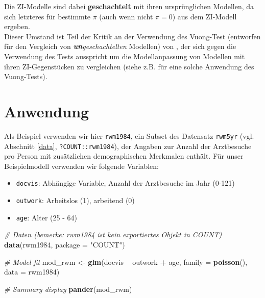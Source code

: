 \documentclass[ngerman,a4paper,]{scrartcl}
\newenvironment{Shaded}{\begin{snugshade}}{\end{snugshade}}
\newcommand{\CommentTok}[1]{\textcolor[rgb]{0.56,0.35,0.01}{\textit{#1}}}
\newcommand{\DataTypeTok}[1]{\textcolor[rgb]{0.13,0.29,0.53}{#1}}
\newcommand{\KeywordTok}[1]{\textcolor[rgb]{0.13,0.29,0.53}{\textbf{#1}}}
\newcommand{\NormalTok}[1]{#1}
\newcommand{\OperatorTok}[1]{\textcolor[rgb]{0.81,0.36,0.00}{\textbf{#1}}}
\newcommand{\StringTok}[1]{\textcolor[rgb]{0.31,0.60,0.02}{#1}}
\providecommand{\tightlist}{%
  \setlength{\itemsep}{0pt}\setlength{\parskip}{0pt}}
\theoremstyle{definition}
\theoremstyle{definition}
\theoremstyle{definition}
\theoremstyle{remark}
\begin{document}
Die ZI-Modelle sind dabei \textbf{geschachtelt} mit ihren ursprünglichen Modellen, da sich letzteres für bestimmte \(\pi\) (auch wenn nicht \(\pi = 0\)) aus dem ZI-Modell ergeben.\\
Dieser Umstand ist Teil der Kritik an der Verwendung des Vuong-Test (entworfen für den Vergleich von \emph{\textbf{un}geschachtelten} Modellen) von \citet{wilson2015MisuseVuong}, der sich gegen die Verwendung des Tests ausspricht um die Modellanpassung von Modellen mit ihren ZI-Gegenstücken zu vergleichen (siehe z.B. \citet{perumean-chaneyZeroinflatedOverdispersedWhat2013} für eine solche Anwendung des Vuong-Tests).

\hypertarget{anwendung}{%
\section{Anwendung}\label{anwendung}}

Als Beispiel verwenden wir hier \texttt{rwm1984}, ein Subset des Datensatz \texttt{rwm5yr} (vgl. Abschnitt \ref{data}, \texttt{?COUNT::rwm1984}), der Angaben zur Anzahl der Arztbesuche pro Person mit zusätzlichen demographischen Merkmalen enthält. Für unser Beispielmodell verwenden wir folgende Variablen:

\begin{itemize}
\tightlist
\item
  \texttt{docvis}: Abhängige Variable, Anzahl der Arztbesuche im Jahr (0-121)
\item
  \texttt{outwork}: Arbeitslos (1), arbeitend (0)
\item
  \texttt{age}: Alter (25 - 64)
\end{itemize}

\begin{Shaded}
\begin{Highlighting}[]
\CommentTok{# Daten (bemerke: rwm1984 ist kein exportiertes Objekt in COUNT)}
\KeywordTok{data}\NormalTok{(rwm1984, }\DataTypeTok{package =} \StringTok{"COUNT"}\NormalTok{)}

\CommentTok{# Model fit}
\NormalTok{mod_rwm <-}\StringTok{ }\KeywordTok{glm}\NormalTok{(docvis }\OperatorTok{~}\StringTok{ }\NormalTok{outwork }\OperatorTok{+}\StringTok{ }\NormalTok{age, }\DataTypeTok{family =} \KeywordTok{poisson}\NormalTok{(), }\DataTypeTok{data =}\NormalTok{ rwm1984)}

\CommentTok{# Summary display}
\KeywordTok{pander}\NormalTok{(mod_rwm)}
\end{Highlighting}
\end{Shaded}
\end{document}
